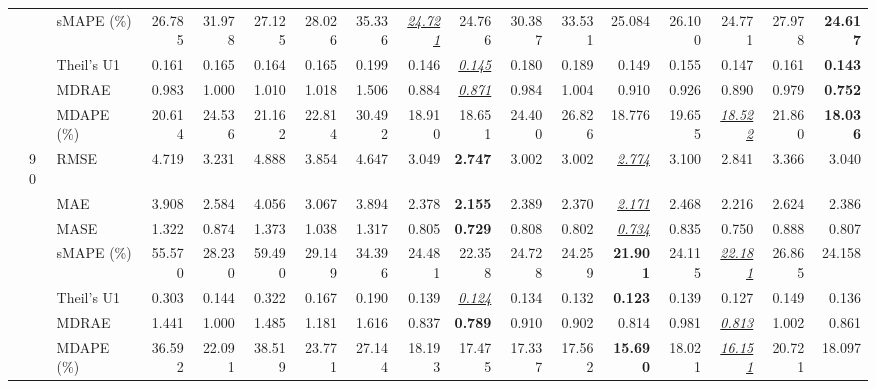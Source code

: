 \begin{table}[!htbp]
{\begin{tabular}{lllrrrrrrrrrrrrrr}
 &  & sMAPE (\%) & 26.785 & 31.978 & 27.125 & 28.026 & 35.336 & \underline{\textit{24.721}} & 24.766 & 30.387 & 33.531 & 25.084 & 26.100 & 24.771 & 27.978 & \textbf{24.617} \\
 &  & Theil's U1 & 0.161 & 0.165 & 0.164 & 0.165 & 0.199 & 0.146 & \underline{\textit{0.145}} & 0.180 & 0.189 & 0.149 & 0.155 & 0.147 & 0.161 & \textbf{0.143} \\
 &  & MDRAE & 0.983 & 1.000 & 1.010 & 1.018 & 1.506 & 0.884 & \underline{\textit{0.871}} & 0.984 & 1.004 & 0.910 & 0.926 & 0.890 & 0.979 & \textbf{0.752} \\
 &  & MDAPE (\%) & 20.614 & 24.536 & 21.162 & 22.814 & 30.492 & 18.910 & 18.651 & 24.400 & 26.826 & 18.776 & 19.655 & \underline{\textit{18.522}} & 21.860 & \textbf{18.036} \\
\cmidrule(lr){2-17}
 & 90 & RMSE & 4.719 & 3.231 & 4.888 & 3.854 & 4.647 & 3.049 & \textbf{2.747} & 3.002 & 3.002 & \underline{\textit{2.774}} & 3.100 & 2.841 & 3.366 & 3.040 \\
 &  & MAE & 3.908 & 2.584 & 4.056 & 3.067 & 3.894 & 2.378 & \textbf{2.155} & 2.389 & 2.370 & \underline{\textit{2.171}} & 2.468 & 2.216 & 2.624 & 2.386 \\
 &  & MASE & 1.322 & 0.874 & 1.373 & 1.038 & 1.317 & 0.805 & \textbf{0.729} & 0.808 & 0.802 & \underline{\textit{0.734}} & 0.835 & 0.750 & 0.888 & 0.807 \\
 &  & sMAPE (\%) & 55.570 & 28.230 & 59.490 & 29.149 & 34.396 & 24.481 & 22.358 & 24.728 & 24.259 & \textbf{21.901} & 24.115 & \underline{\textit{22.181}} & 26.865 & 24.158 \\
 &  & Theil's U1 & 0.303 & 0.144 & 0.322 & 0.167 & 0.190 & 0.139 & \underline{\textit{0.124}} & 0.134 & 0.132 & \textbf{0.123} & 0.139 & 0.127 & 0.149 & 0.136 \\
 &  & MDRAE & 1.441 & 1.000 & 1.485 & 1.181 & 1.616 & 0.837 & \textbf{0.789} & 0.910 & 0.902 & 0.814 & 0.981 & \underline{\textit{0.813}} & 1.002 & 0.861 \\
 &  & MDAPE (\%) & 36.592 & 22.091 & 38.519 & 23.771 & 27.144 & 18.193 & 17.475 & 17.337 & 17.562 & \textbf{15.690} & 18.021 & \underline{\textit{16.151}} & 20.721 & 18.097 \\
\bottomrule
\end{tabular}}
\end{table}